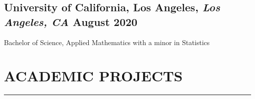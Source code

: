 \documentclass[10pt]{article}
\begin{document}
\subsection*{University of California, Los Angeles{\normalfont, \textit{Los Angeles, CA} \hfill August 2020}}
Bachelor of Science, Applied Mathematics with a minor in Statistics

\vspace{0.1in}

\section*{\MakeUppercase{Academic Projects}}
\hrule
\medskip
\end{document}

